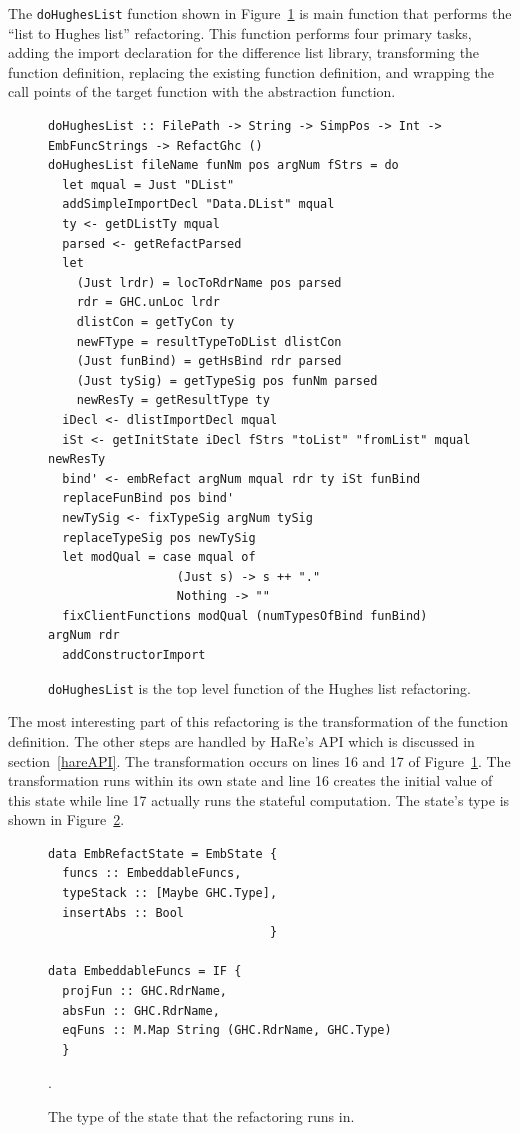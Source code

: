 The \texttt{doHughesList} function shown in Figure~\ref{doHughesList} is main function that performs the ``list to Hughes list'' refactoring. This function performs four primary tasks, adding the import declaration for the difference list library, transforming the function definition, replacing the existing function definition, and wrapping the call points of the target function with the abstraction function.

\begin{figure}[t]
\begin{lstlisting}
doHughesList :: FilePath -> String -> SimpPos -> Int -> EmbFuncStrings -> RefactGhc ()
doHughesList fileName funNm pos argNum fStrs = do
  let mqual = Just "DList"
  addSimpleImportDecl "Data.DList" mqual
  ty <- getDListTy mqual
  parsed <- getRefactParsed
  let
    (Just lrdr) = locToRdrName pos parsed
    rdr = GHC.unLoc lrdr
    dlistCon = getTyCon ty
    newFType = resultTypeToDList dlistCon 
    (Just funBind) = getHsBind rdr parsed
    (Just tySig) = getTypeSig pos funNm parsed
    newResTy = getResultType ty
  iDecl <- dlistImportDecl mqual
  iSt <- getInitState iDecl fStrs "toList" "fromList" mqual newResTy
  bind' <- embRefact argNum mqual rdr ty iSt funBind
  replaceFunBind pos bind'
  newTySig <- fixTypeSig argNum tySig
  replaceTypeSig pos newTySig
  let modQual = case mqual of
                  (Just s) -> s ++ "."
                  Nothing -> ""
  fixClientFunctions modQual (numTypesOfBind funBind) argNum rdr
  addConstructorImport
\end{lstlisting}
\caption{\texttt{doHughesList} is the top level function of the Hughes list refactoring.}
\label{doHughesList}
\end{figure}

The most interesting part of this refactoring is the transformation of the function definition. The other steps are handled by HaRe's API which is discussed in section~\ref{hareAPI}. The transformation occurs on lines 16 and 17 of Figure~\ref{doHughesList}. The transformation runs within its own state and line 16 creates the initial value of this state while line 17 actually runs the stateful computation. The state's type is shown in Figure~\ref{embState}.

\begin{figure}[t]
\begin{lstlisting}
data EmbRefactState = EmbState {
  funcs :: EmbeddableFuncs,
  typeStack :: [Maybe GHC.Type],
  insertAbs :: Bool
                               }
                               
data EmbeddableFuncs = IF {
  projFun :: GHC.RdrName,
  absFun :: GHC.RdrName,
  eqFuns :: M.Map String (GHC.RdrName, GHC.Type)
  }
\end{lstlisting}
\caption{The type of the state that the refactoring runs in.}
\label{embState}.
\end{figure}

